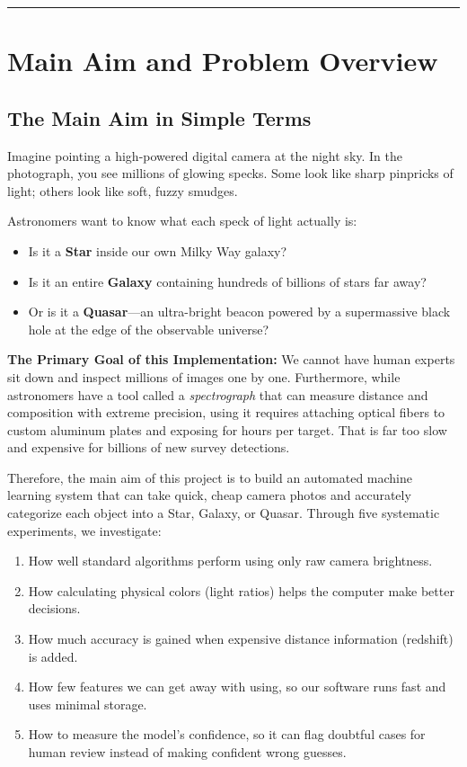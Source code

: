 \documentclass[11pt,a4paper]{article}
\begin{document}
\vspace{-0.5em}
\tableofcontents
\vspace{1em}
\hrule
\vspace{1em}

\section{Main Aim and Problem Overview}

\subsection{The Main Aim in Simple Terms}
Imagine pointing a high-powered digital camera at the night sky. In the photograph, you see millions of glowing specks. Some look like sharp pinpricks of light; others look like soft, fuzzy smudges. 

Astronomers want to know what each speck of light actually is:
\begin{itemize}[noitemsep]
    \item Is it a \textbf{Star} inside our own Milky Way galaxy?
    \item Is it an entire \textbf{Galaxy} containing hundreds of billions of stars far away?
    \item Or is it a \textbf{Quasar}---an ultra-bright beacon powered by a supermassive black hole at the edge of the observable universe?
\end{itemize}

\textbf{The Primary Goal of this Implementation:}  
We cannot have human experts sit down and inspect millions of images one by one. Furthermore, while astronomers have a tool called a \emph{spectrograph} that can measure distance and composition with extreme precision, using it requires attaching optical fibers to custom aluminum plates and exposing for hours per target. That is far too slow and expensive for billions of new survey detections.

Therefore, the main aim of this project is to build an automated machine learning system that can take quick, cheap camera photos and accurately categorize each object into a Star, Galaxy, or Quasar. Through five systematic experiments, we investigate:
\begin{enumerate}[noitemsep]
    \item How well standard algorithms perform using only raw camera brightness.
    \item How calculating physical colors (light ratios) helps the computer make better decisions.
    \item How much accuracy is gained when expensive distance information (redshift) is added.
    \item How few features we can get away with using, so our software runs fast and uses minimal storage.
    \item How to measure the model's confidence, so it can flag doubtful cases for human review instead of making confident wrong guesses.
\end{enumerate}
\end{document}
